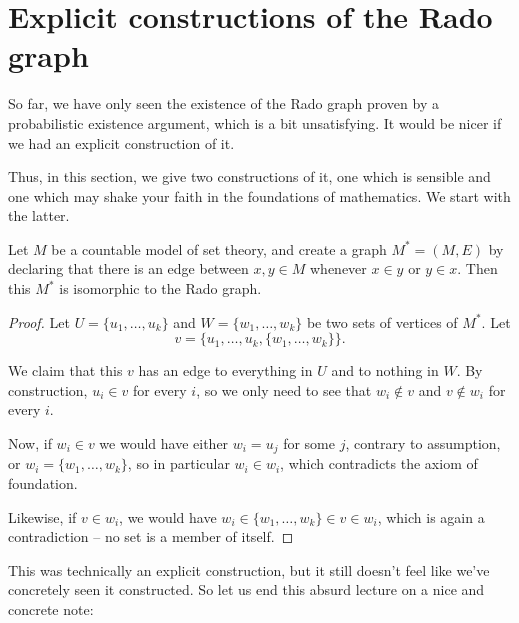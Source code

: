 \documentclass[nobib]{tufte-handout}
\begin{document}
\section{Explicit constructions of the Rado graph}

So far, we have only seen the existence of the Rado graph proven by a probabilistic existence argument, which is a bit unsatisfying. It would be nicer if we had an explicit construction of it.

Thus, in this section, we give two constructions of it, one which is sensible and one which may shake your faith in the foundations of mathematics. We start with the latter.

\begin{proposition}
    Let $M$ be a countable model of set theory, and create a graph $M^* = (M,E)$ by declaring that there is an edge between $x, y \in M$ whenever $x \in y$ or $y \in x$. Then this $M^*$ is isomorphic to the Rado graph.

    \begin{proof}
        Let $U = \{u_1,\ldots,u_k\}$ and $W = \{w_1,\ldots,w_k\}$ be two sets of vertices of $M^*$. Let 
        $$v = \{u_1,\ldots,u_k, \{w_1,\ldots,w_k\}\}.$$
        
        We claim that this $v$ has an edge to everything in $U$ and to nothing in $W$. By construction, $u_i \in v$ for every $i$, so we only need to see that $w_i \not\in v$ and $v \not\in w_i$ for every $i$.

        Now, if $w_i \in v$ we would have either $w_i = u_j$ for some $j$, contrary to assumption, or $w_i = \{w_1,\ldots,w_k\}$, so in particular $w_i \in w_i$, which contradicts the axiom of foundation.

        Likewise, if $v \in w_i$, we would have $w_i \in \{w_1,\ldots,w_k\} \in v \in w_i$, which is again a contradiction -- no set is a member of itself.
    \end{proof}
\end{proposition}

This was technically an explicit construction, but it still doesn't feel like we've concretely seen it constructed. So let us end this absurd lecture on a nice and concrete note:
\end{document}
